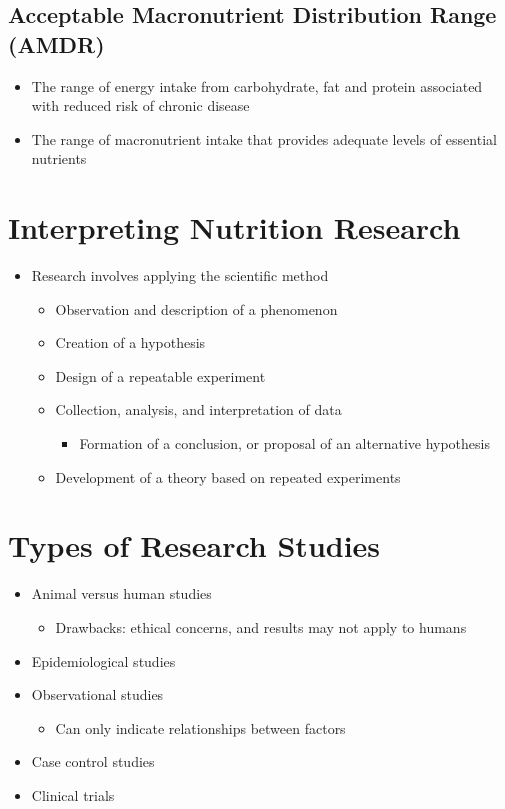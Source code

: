 \documentclass[title={Chapter 1}]{fdsn201notes}
\begin{document}
\subsection{Acceptable Macronutrient Distribution Range (AMDR)}\label{subsec:acceptable-macronutrient-distribution-range-(amdr)}
\begin{itemize}
	\item The range of energy intake from carbohydrate, fat and protein associated with reduced risk of chronic disease
	\item The range of macronutrient intake that provides adequate levels of essential nutrients
\end{itemize}

\section{Interpreting Nutrition Research}\label{sec:interpreting-nutrition-research}
\begin{itemize}
	\item Research involves applying the scientific method
	\begin{itemize}
		\item Observation and description of a phenomenon
		\item Creation of a hypothesis
		\item Design of a repeatable experiment
		\item Collection, analysis, and interpretation of data
		\begin{itemize}
			\item Formation of a conclusion, or proposal of an alternative hypothesis
		\end{itemize}
		\item Development of a theory based on repeated experiments
	\end{itemize}
\end{itemize}

\section{Types of Research Studies}\label{sec:types-of-research-studies}
\begin{itemize}
	\item Animal versus human studies
	\begin{itemize}
		\item Drawbacks: ethical concerns, and results may not apply to humans
	\end{itemize}
	\item Epidemiological studies
	\item Observational studies
	\begin{itemize}
		\item Can only indicate relationships between factors
	\end{itemize}
	\item Case control studies
	\item Clinical trials
\end{itemize}
\end{document}
